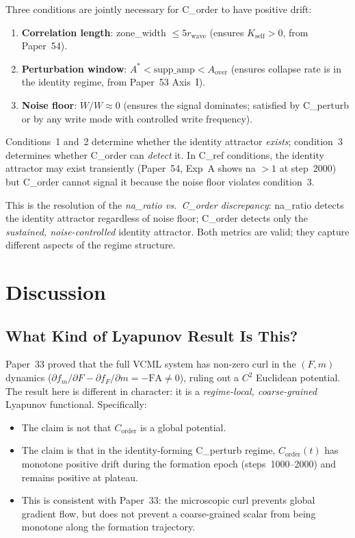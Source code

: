 \documentclass[11pt,a4paper]{article}
\begin{document}
Three conditions are jointly necessary for C\_order to have positive drift:
\begin{enumerate}
  \item \textbf{Correlation length}: zone\_width $\leq 5 r_\mathrm{wave}$
    (ensures $K_\mathrm{self} > 0$, from Paper~54).
  \item \textbf{Perturbation window}: $A^* < \mathrm{supp\_amp} < A_\mathrm{over}$
    (ensures collapse rate is in the identity regime, from Paper~53 Axis~I).
  \item \textbf{Noise floor}: $\dot{W}/W \approx 0$ (ensures the signal
    dominates; satisfied by C\_perturb or by any write mode with controlled
    write frequency).
\end{enumerate}

Conditions~1 and~2 determine whether the identity attractor \emph{exists};
condition~3 determines whether C\_order can \emph{detect} it.
In C\_ref conditions, the identity attractor may exist transiently (Paper~54,
Exp~A shows na $> 1$ at step~2000) but C\_order cannot signal it because
the noise floor violates condition~3.

This is the resolution of the \emph{na\_ratio vs.\ C\_order discrepancy}:
na\_ratio detects the identity attractor regardless of noise floor;
C\_order detects only the \emph{sustained, noise-controlled} identity attractor.
Both metrics are valid; they capture different aspects of the regime structure.

\section{Discussion}

\subsection{What Kind of Lyapunov Result Is This?}

Paper~33 proved that the full VCML system has non-zero curl in the $(F, m)$
dynamics ($\partial f_m / \partial F - \partial f_F / \partial m = -\mathrm{FA} \neq 0$),
ruling out a $C^2$ Euclidean potential.
The result here is different in character: it is a \emph{regime-local, coarse-grained}
Lyapunov functional.
Specifically:

\begin{itemize}
  \item The claim is not that $C_\mathrm{order}$ is a global potential.
  \item The claim is that in the identity-forming C\_perturb regime,
    $C_\mathrm{order}(t)$ has monotone positive drift during the formation
    epoch (steps~1000--2000) and remains positive at plateau.
  \item This is consistent with Paper~33: the microscopic curl prevents global
    gradient flow, but does not prevent a coarse-grained scalar from being
    monotone along the formation trajectory.
\end{itemize}
\end{document}
